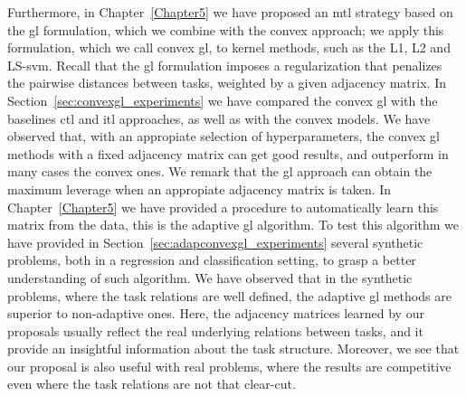 Furthermore, in Chapter~\ref{Chapter5} we have proposed an \acrshort{mtl} strategy based on the \acrshort{gl} formulation, which we combine with the convex approach; we apply this formulation, which we call convex \acrshort{gl}, to kernel methods, such as the L1, L2 and LS-\acrshort{svm}.
Recall that the \acrshort{gl} formulation imposes a regularization that penalizes the pairwise distances between tasks, weighted by a given adjacency matrix.
In Section~\ref{sec:convexgl_experiments} we have compared the convex \acrshort{gl} with the baselines \acrshort{ctl} and \acrshort{itl} approaches, as well as with the convex models. We have observed that, with an appropiate selection of hyperparameters, the convex \acrshort{gl} methods with a fixed adjacency matrix can get good results, and outperform in many cases the convex ones.
%
We remark that the \acrshort{gl} approach can obtain the maximum leverage when an appropiate adjacency matrix is taken. In Chapter~\ref{Chapter5} we have provided a procedure to automatically learn this matrix from the data, this is the adaptive \acrshort{gl} algorithm. To test this algorithm we have provided in Section~\ref{sec:adapconvexgl_experiments} several synthetic problems, both in a regression and classification setting, to grasp a better understanding of such algorithm. We have observed that in the synthetic problems, where the task relations are well defined, the adaptive \acrshort{gl} methods are superior to non-adaptive ones. 
%
Here, the adjacency matrices learned by our proposals usually reflect the real underlying relations between tasks, and it provide an insightful information about the task structure.
%
Moreover, we see that our proposal is also useful with real problems, where the results are competitive even where the task relations are not that clear-cut.

